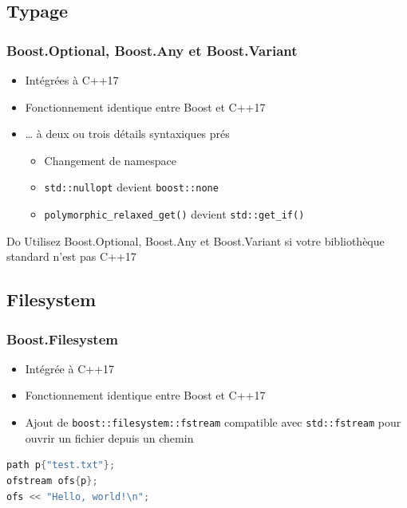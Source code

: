 \documentclass[C++.tex]{subfiles}
\begin{document}
\subsection*{Typage}
\begin{frame}[fragile]
	\frametitle{Boost.Optional, Boost.Any et Boost.Variant}
	\begin{itemize}
		\item Intégrées à C++17
		\item Fonctionnement identique entre Boost et C++17
		\item \ldots{} à deux ou trois détails syntaxiques prés
		\begin{itemize}
			\item Changement de namespace
			\item \lstinline|std::nullopt| devient \lstinline|boost::none|
			\item \lstinline|polymorphic_relaxed_get()| devient \lstinline|std::get_if()|
		\end{itemize}
	\end{itemize}

	\begin{exampleblock}{Do}
		Utilisez Boost.Optional, Boost.Any et Boost.Variant si votre bibliothèque standard n'est pas C++17
	\end{exampleblock}
\end{frame}

\subsection*{Filesystem}
\begin{frame}[fragile]
	\frametitle{Boost.Filesystem}
	\begin{itemize}
		\item Intégrée à C++17
		\item Fonctionnement identique entre Boost et C++17
		\item Ajout de \lstinline|boost::filesystem::fstream| compatible avec \lstinline|std::fstream| pour ouvrir un fichier depuis un chemin

	\end{itemize}

	\begin{lstlisting}[language=C++]
path p{"test.txt"};
ofstream ofs{p};
ofs << "Hello, world!\n";\end{lstlisting}
\end{frame}
\end{document}
